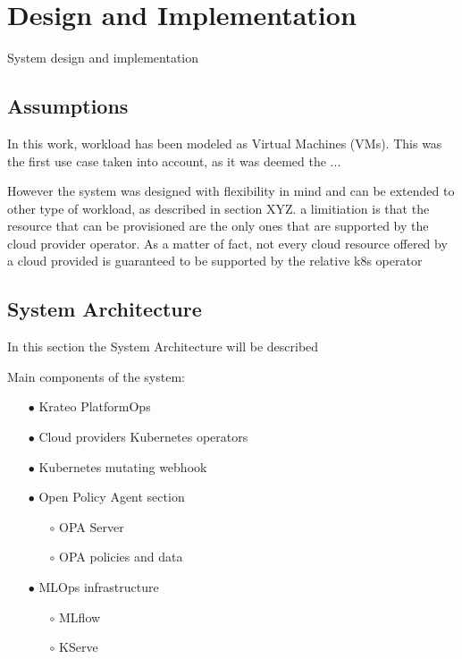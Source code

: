 \chapter{Design and Implementation}
\label{cha:design}

System design and implementation

\section{Assumptions}

In this work, workload has been modeled as Virtual Machines (VMs).
This was the first use case taken into account, as it was deemed the ...


However the system was designed with flexibility in mind and can be extended to other type of workload, as described in section XYZ.
a limitiation is that the resource that can be provisioned are the only ones that are supported by the cloud provider operator.
As a matter of fact, not every cloud resource offered by a cloud provided is guaranteed to be supported by the relative k8s operator



\section{System Architecture}
\label{sec:system_architecture}


In this section the System Architecture will be described

Main components of the system:
\begin{itemize}[itemsep=0.2pt, topsep=1pt]
  \item[$\bullet$] Krateo PlatformOps
  \item[$\bullet$] Cloud providers Kubernetes operators
  \item[$\bullet$] Kubernetes mutating webhook
  \item[$\bullet$] Open Policy Agent section
  \begin{itemize}[itemsep=1pt, topsep=1pt]
    \item[$\circ$] OPA Server
    \item[$\circ$] OPA policies and data
  \end{itemize}
  \item[$\bullet$] MLOps infrastructure
  \begin{itemize}[itemsep=1pt, topsep=1pt]
    \item[$\circ$] MLflow
    \item[$\circ$] KServe
  \end{itemize}
\end{itemize}




